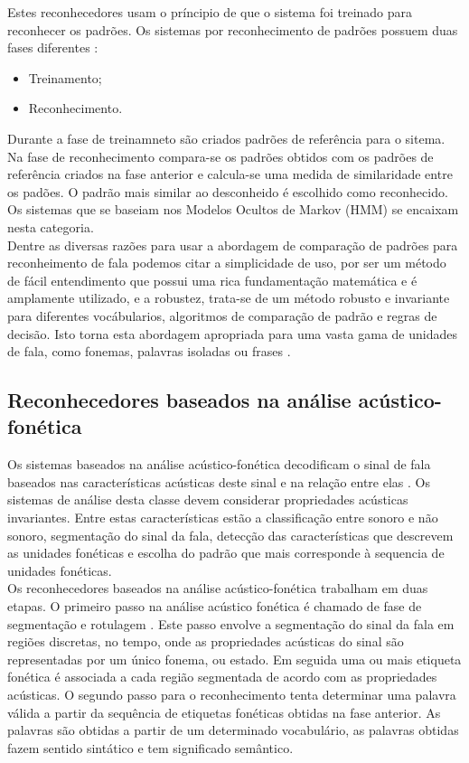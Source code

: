Estes reconhecedores usam o príncipio de que o sistema foi treinado para reconhecer os padrões. Os sistemas por reconhecimento de padrões possuem duas fases diferentes :
\begin{itemize}
\item Treinamento;
\item Reconhecimento.
\end{itemize}

Durante a fase de treinamneto são criados padrões de referência para o sitema. Na fase de reconhecimento compara-se os padrões obtidos com os padrões de referência criados na fase anterior e calcula-se uma medida de similaridade entre os padões. O padrão mais similar ao desconheido é escolhido como reconhecido. Os sistemas que se baseiam nos Modelos Ocultos de Markov (HMM) se encaixam nesta categoria.\\

Dentre as diversas razões para usar a abordagem de comparação de padrões para reconheimento de fala podemos citar a simplicidade de uso, por ser um método de fácil entendimento que possui uma rica fundamentação matemática e é amplamente utilizado,  e a robustez, trata-se de um método robusto e invariante para diferentes vocábularios, algoritmos de comparação de padrão e regras de decisão. Isto torna esta abordagem apropriada para uma vasta gama de unidades de fala, como fonemas, palavras isoladas ou frases  \cite{fundRecFala}. 

\subsection{Reconhecedores baseados na análise acústico-fonética}

Os sistemas baseados na análise acústico-fonética decodificam o sinal de fala  baseados nas características acústicas deste sinal e na relação entre elas \cite{kluwer}. Os sistemas de análise desta classe devem considerar propriedades acústicas invariantes. Entre estas características estão a classificação entre sonoro e não sonoro, segmentação do sinal da fala, detecção das características que descrevem as unidades fonéticas e escolha do padrão que mais corresponde à sequencia de unidades fonéticas.\\

Os reconhecedores baseados na análise acústico-fonética trabalham em duas etapas. O primeiro passo na análise acústico fonética é chamado de fase de segmentação e rotulagem \cite{fundRecFala}. Este passo envolve a segmentação do sinal da fala em regiões discretas, no tempo, onde as propriedades acústicas do sinal são representadas por um único fonema, ou estado. Em seguida uma ou mais etiqueta fonética é associada a cada região segmentada de acordo com as propriedades acústicas. O segundo passo para o reconhecimento tenta determinar uma palavra válida a partir da sequência de etiquetas fonéticas obtidas na fase anterior. As palavras são obtidas a partir de um determinado vocabulário, as palavras obtidas fazem sentido sintático e tem significado semântico.

